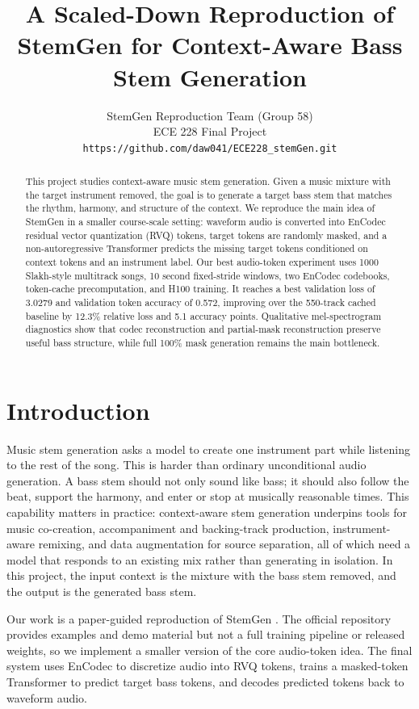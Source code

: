\documentclass{article}
\title{A Scaled-Down Reproduction of StemGen for Context-Aware Bass Stem Generation}
\author{%
  StemGen Reproduction Team (Group 58) \\
  ECE 228 Final Project \\
  \texttt{https://github.com/daw041/ECE228\_stemGen.git}
}
\begin{document}
\maketitle

\begin{abstract}
This project studies context-aware music stem generation. Given a music mixture with the target instrument removed, the goal is to generate a target bass stem that matches the rhythm, harmony, and structure of the context. We reproduce the main idea of StemGen in a smaller course-scale setting: waveform audio is converted into EnCodec residual vector quantization (RVQ) tokens, target tokens are randomly masked, and a non-autoregressive Transformer predicts the missing target tokens conditioned on context tokens and an instrument label. Our best audio-token experiment uses 1000 Slakh-style multitrack songs, 10 second fixed-stride windows, two EnCodec codebooks, token-cache precomputation, and H100 training. It reaches a best validation loss of 3.0279 and validation token accuracy of 0.572, improving over the 550-track cached baseline by 12.3\% relative loss and 5.1 accuracy points. Qualitative mel-spectrogram diagnostics show that codec reconstruction and partial-mask reconstruction preserve useful bass structure, while full 100\% mask generation remains the main bottleneck.
\end{abstract}

\section{Introduction}

Music stem generation asks a model to create one instrument part while listening to the rest of the song. This is harder than ordinary unconditional audio generation. A bass stem should not only sound like bass; it should also follow the beat, support the harmony, and enter or stop at musically reasonable times. This capability matters in practice: context-aware stem generation underpins tools for music co-creation, accompaniment and backing-track production, instrument-aware remixing, and data augmentation for source separation, all of which need a model that responds to an existing mix rather than generating in isolation. In this project, the input context is the mixture with the bass stem removed, and the output is the generated bass stem.

Our work is a paper-guided reproduction of StemGen \citep{stemgen}. The official repository provides examples and demo material but not a full training pipeline or released weights, so we implement a smaller version of the core audio-token idea. The final system uses EnCodec \citep{encodec} to discretize audio into RVQ tokens, trains a masked-token Transformer to predict target bass tokens, and decodes predicted tokens back to waveform audio.
\end{document}
